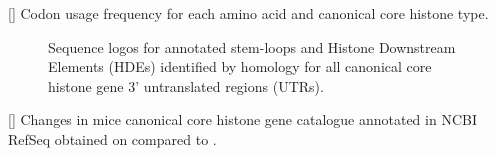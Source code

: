 \newpage
{}[]{%
  Codon usage frequency for each amino acid
  and canonical core histone type.
}


\newpage
\begin{figure}[h!]
  \centering
  \hfill
  \caption[]{%
    Sequence logos for
     annotated stem-loops and
      Histone Downstream Elements (HDEs)
    identified by homology
    for all canonical core histone gene 3' untranslated regions (UTRs).
  }
\end{figure}

\newpage
\begin{center}
  []{
    Changes in mice canonical core histone gene catalogue
    annotated in NCBI RefSeq obtained on \SequencesDate{}
    compared to \citet{Marzluff02}.
  }
  
\end{center}
